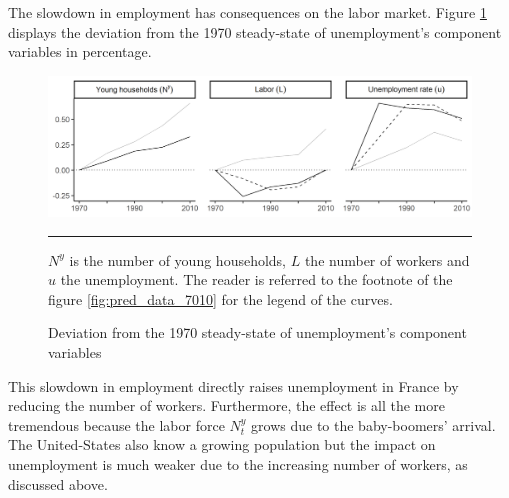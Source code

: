 The slowdown in employment has consequences on the labor market. Figure \ref{fig:dev_unemp_7010} displays the deviation from the 1970 steady-state of unemployment's component variables in percentage.
\begin{figure}[tb]
	\centering
	\includegraphics[width=1\linewidth]{../result/deviation/dev_unemp7010.png}
	\caption{Deviation from the 1970 steady-state of unemployment's component variables}
	\label{fig:dev_unemp_7010}
	\vspace{.5ex}
	\hrule
	\vspace{-4ex}
	\justify\singlespacing\footnotesize $N^y$ is the number of young households, $L$ the number of workers and $u$ the unemployment. The reader is referred to the footnote of the figure \ref{fig:pred_data_7010} for the legend of the curves.
\end{figure}
This slowdown in employment directly raises unemployment in France by reducing the number of workers. Furthermore, the effect is all the more tremendous because the labor force $N_t^y$ grows due to the baby-boomers' arrival. The United-States also know a growing population but the impact on unemployment is much weaker due to the increasing number of workers, as discussed above.

